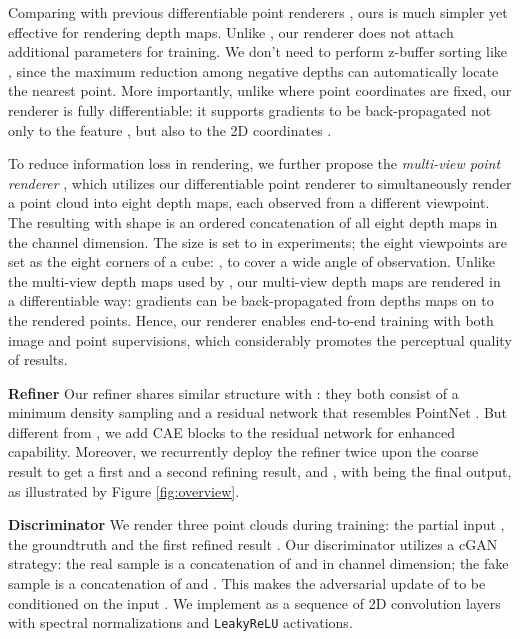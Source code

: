 \documentclass[final]{cvpr}
\begin{document}
Comparing with previous differentiable point renderers \cite{insafutdinov2018unsupervised,yifan2019differentiable,aliev2019neural,wiles2020synsin,dai2020neural}, ours is much simpler yet effective for rendering depth maps. Unlike \cite{dai2020neural}, our renderer does not attach additional parameters for training. We don't need to perform z-buffer sorting like \cite{wiles2020synsin,insafutdinov2018unsupervised}, since the maximum reduction among negative depths can automatically locate the nearest point. 
More importantly, unlike \cite{aliev2019neural} where point coordinates are fixed, our renderer is fully differentiable: it supports gradients to be back-propagated not only to the feature , but also to the 2D coordinates .

To reduce information loss in rendering, we further propose the \emph{multi-view point renderer} , which utilizes our differentiable point renderer to simultaneously render a point cloud  into eight depth maps, each observed from a different viewpoint. 
The resulting  with shape  is an ordered concatenation of all eight depth maps in the channel dimension. 
The size  is set to  in experiments; the eight viewpoints are set as the eight corners of a cube: , to cover a wide angle of observation. 
Unlike the multi-view depth maps used by \cite{hu2019render4completion}, our multi-view depth maps are rendered in a differentiable way: gradients can be back-propagated from depths maps on to the rendered points. Hence, our renderer enables end-to-end training with both image and point supervisions, which considerably promotes the perceptual quality of results.



\noindent\textbf{Refiner}
Our refiner  shares similar structure with \cite{liu2019morphing}: they both consist of a minimum density sampling and a residual network that resembles PointNet \cite{qi2017pointnet}. But different from \cite{liu2019morphing}, we add CAE blocks to the residual network for enhanced capability. Moreover, we recurrently deploy the refiner twice upon the coarse result  to get a first and a second refining result,  and , with  being the final output, as illustrated by Figure \ref{fig:overview}.






\noindent\textbf{Discriminator}
We render three point clouds during training: the partial input , the groundtruth  and the first refined result . Our discriminator  utilizes a cGAN \cite{mirza2014conditional} strategy: the real sample is a concatenation of  and  in channel dimension; the fake sample is a concatenation of  and . This makes the adversarial update of  to be conditioned on the input .
We implement  as a sequence of 2D convolution layers with spectral normalizations \cite{miyato2018spectral} and \texttt{LeakyReLU} activations. 
\end{document}
